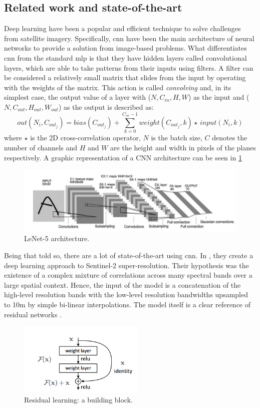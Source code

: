 \documentclass[11pt, a4paper]{article}
\begin{document}
	\subsection{Related work and state-of-the-art}
	Deep learning have been a popular and efficient technique to solve challenges from satellite imagery. Specifically, \gls{cnn} have been the main architecture of neural networks to provide a solution from image-based problems. What differentiates \gls{cnn} from the standard \gls{mlp} is that they have hidden layers called convolutional layers, which are able to take patterns from their inputs using filters. A filter can be considered a relatively small matrix that slides from the input by operating with the weights of the matrix. This action is called \textit{convolving }and, in its simplest case, the output value of a layer with ($N, C_{in}, H, W$) as the input and ($N, C_{out}, H_{out}, W_{out}$) as the output is described as:
	\[out(N_i, C_{out_j}) = bias(C_{out_j}) + \sum_{k=0}^{C_{in} - 1} weight(C_{out_j}, k) \star \, input(N_i, k)\]
	where $\star$ is the 2D cross-correlation operator, $N$ is the batch size, $C$ denotes the number of channels and $H$ and $W$ are the height and width in pixels of the planes respectively. A graphic representation of a CNN architecture can be seen in \ref{fig:related-lenet}
	\begin{figure}[H]
		\centering
		\includegraphics[width=14cm]{imgs/relatedwork/lenet-5.jpeg}
		\caption{LeNet-5 architecture.}
		\label{fig:related-lenet}
	\end{figure}
	Being that told so, there are a lot of state-of-the-art using \gls{cnn}. In \cite{LANARAS2018305}, they create a deep learning approach to Sentinel-2 super-resolution. Their hypothesis was the existence of a complex mixture of correlations across many spectral bands over a large spatial context. Hence, the input of the model is a concatenation of the high-level resolution bands with the low-level resolution bandwidths upsampled to 10m by simple bi-linear interpolations. The model itself is a clear reference of residual networks \cite{he2016deep}.
	\begin{figure}[H]
		\centering
		\includegraphics[width=6cm]{imgs/relatedwork/residualblock.png}
		\caption{Residual learning: a building block.}
	\end{figure}
\end{document}
